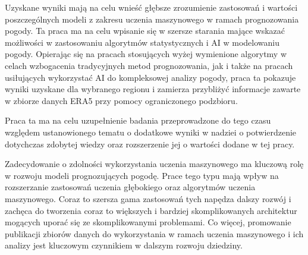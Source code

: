 Uzyskane wyniki mają na celu wnieść głębsze zrozumienie zastosowań i wartości 
poszczególnych modeli z zakresu uczenia maszynowego w ramach prognozowania pogody.
Ta praca ma na celu wpisanie się w szersze starania mające wskazać możliwości
w zastosowaniu algorytmów statystycznych i AI w modelowaniu pogody. Opierając
się na pracach stosujących wyżej wymienione algorytmy w celach wzbogacenia
tradycyjnych metod prognozowania, jak i także na pracach usiłujących wykorzystać AI
do kompleksowej analizy pogody, praca ta pokazuje wyniki uzyskane dla wybranego
regionu i zamierza przybliżyć informacje zawarte w zbiorze danych ERA5 przy pomocy
ograniczonego podzbioru.

Praca ta ma na celu uzupełnienie badania przeprowadzone do tego czasu względem 
ustanowionego tematu o dodatkowe wyniki w nadziei o potwierdzenie dotychczas 
zdobytej wiedzy oraz rozszerzenie jej o wartości dodane w tej pracy.

Zadecydowanie o zdolności wykorzystania uczenia maszynowego ma kluczową rolę w 
rozwoju modeli prognozujących pogodę. Prace tego typu mają wpływ na rozszerzanie
zastosowań uczenia głębokiego oraz algorytmów uczenia maszynowego. Coraz to szersza
gama zastosowań tych napędza dalszy rozwój i zachęca do tworzenia coraz to większych
i bardziej skomplikowanych architektur mogących uporać się ze skomplikowanymi problemami.
Co więcej, promowanie publikacji zbiorów danych do wykorzystania w ramach uczenia
maszynowego i ich analizy jest kluczowym czynnikiem w dalszym rozwoju dziedziny.